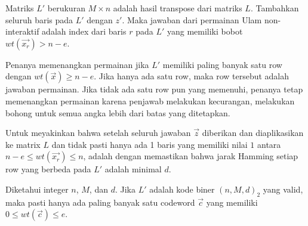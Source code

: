 Matriks $L'$ berukuran $M \times n$ adalah hasil transpose dari matriks $L$. Tambahkan seluruh baris pada $L'$ dengan $z'$. Maka jawaban dari permainan Ulam non-interaktif adalah index dari baris $r$ pada $L'$ yang memiliki bobot $wt(\vec{x_r}) > n-e$.

Penanya memenangkan permainan jika $L'$ memiliki paling banyak satu row dengan $wt(\vec{x}) \ge n-e$. Jika hanya ada satu row, maka row tersebut adalah jawaban permainan. Jika tidak ada satu row pun yang memenuhi, penanya tetap memenangkan permainan karena penjawab melakukan kecurangan, melakukan bohong untuk semua angka lebih dari batas yang ditetapkan.

Untuk meyakinkan bahwa setelah seluruh jawaban $\vec{z}$ diberikan dan diaplikasikan ke matrix $L$ dan tidak pasti hanya ada 1 baris yang memiliki nilai $1$ antara $n-e \le wt(\vec{x_r}) \le n$, adalah dengan memastikan bahwa jarak Hamming setiap row yang berbeda pada $L'$ adalah minimal $d$.

\begin{lemma}
Diketahui integer $n$, $M$, dan $d$. Jika $L'$ adalah kode biner $(n,M,d)_2$ yang valid, maka pasti hanya ada paling banyak satu codeword $\vec{c}$ yang memiliki $0 \le wt(\vec{c}) \le e$.
\end{lemma}

